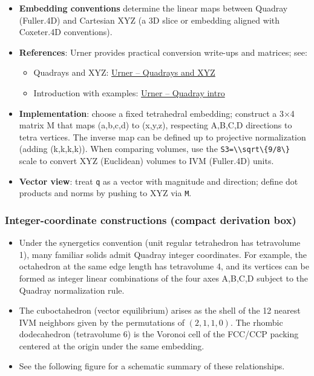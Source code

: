 \documentclass[
  10pt,
]{article}
\newcommand{\passthrough}[1]{#1}
\providecommand{\tightlist}{%
  \setlength{\itemsep}{0pt}\setlength{\parskip}{0pt}}
\begin{document}
\begin{itemize}
\tightlist
\item
  \textbf{Embedding conventions} determine the linear maps between
  Quadray (Fuller.4D) and Cartesian XYZ (a 3D slice or embedding aligned
  with Coxeter.4D conventions).
\item
  \textbf{References}: Urner provides practical conversion write-ups and
  matrices; see:

  \begin{itemize}
  \tightlist
  \item
    Quadrays and XYZ:
    \href{https://www.grunch.net/synergetics/quadxyz.html}{Urner --
    Quadrays and XYZ}
  \item
    Introduction with examples:
    \href{https://www.grunch.net/synergetics/quadintro.html}{Urner --
    Quadray intro}
  \end{itemize}
\item
  \textbf{Implementation}: choose a fixed tetrahedral embedding;
  construct a 3×4 matrix M that maps (a,b,c,d) to (x,y,z), respecting
  A,B,C,D directions to tetra vertices. The inverse map can be defined
  up to projective normalization (adding (k,k,k,k)). When comparing
  volumes, use the \passthrough{\lstinline!S3=\\sqrt\{9/8\}!} scale to
  convert XYZ (Euclidean) volumes to IVM (Fuller.4D) units.
\item
  \textbf{Vector view}: treat \passthrough{\lstinline!q!} as a vector
  with magnitude and direction; define dot products and norms by pushing
  to XYZ via \passthrough{\lstinline!M!}.
\end{itemize}

\hypertarget{integer-coordinate-constructions-compact-derivation-box}{%
\subsubsection{Integer-coordinate constructions (compact derivation
box)}\label{integer-coordinate-constructions-compact-derivation-box}}

\begin{itemize}
\tightlist
\item
  Under the synergetics convention (unit regular tetrahedron has
  tetravolume 1), many familiar solids admit Quadray integer
  coordinates. For example, the octahedron at the same edge length has
  tetravolume 4, and its vertices can be formed as integer linear
  combinations of the four axes A,B,C,D subject to the Quadray
  normalization rule.
\item
  The cuboctahedron (vector equilibrium) arises as the shell of the 12
  nearest IVM neighbors given by the permutations of \((2,1,1,0)\). The
  rhombic dodecahedron (tetravolume 6) is the Voronoi cell of the
  FCC/CCP packing centered at the origin under the same embedding.
\item
  See the following figure for a schematic summary of these
  relationships.
\end{itemize}
\end{document}
